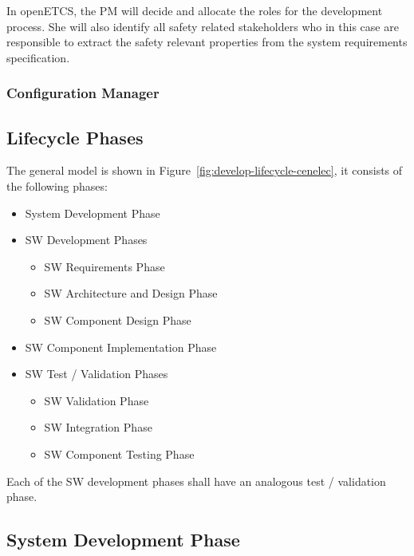 In openETCS, the PM will decide and allocate the roles for the development
process. She will also identify all safety related stakeholders who in this case
are responsible to extract the safety relevant properties from the system
requirements specification.

\subsubsection{Configuration Manager}
\label{sec:conf-manag}


\subsection{Lifecycle Phases}
\label{sec:lifecycle-phases}

The general model is shown in Figure~\ref{fig:develop-lifecycle-cenelec}, it
consists of the following phases:

\begin{itemize}
\item System Development Phase
\item SW Development Phases
  \begin{itemize}
  \item SW Requirements Phase
  \item SW Architecture and Design Phase
  \item SW Component Design Phase
  \end{itemize}
\item SW Component Implementation Phase
\item SW Test / Validation Phases
  \begin{itemize}
  \item SW Validation Phase
  \item SW Integration Phase
  \item SW Component Testing Phase
  \end{itemize}
\end{itemize}

Each of the SW development phases shall have an analogous test / validation
phase.

\subsection{System Development Phase}
\label{sec:syst-devel-phase}



